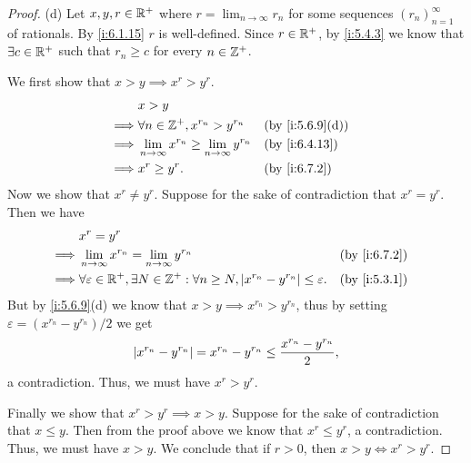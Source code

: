 \begin{proof}{(d)}
  Let \(x, y, r \in \mathbb{R}^+\) where \(r = \lim_{n \to \infty} r_n\) for some sequences \((r_n)_{n = 1}^\infty\) of rationals.
  By \cref{i:6.1.15} \(r\) is well-defined.
  Since \(r \in \mathbb{R}^+\), by \cref{i:5.4.3} we know that \(\exists c \in \mathbb{R}^+\) such that \(r_n \geq c\) for every \(n \in \mathbb{Z}^+\).

  We first show that \(x > y \implies x^r > y^r\).
  \begin{align*}
             & x > y                                                                             \\
    \implies & \forall n \in \Z^+, x^{r_n} > y^{r_n}                        &  & \by{i:5.6.9}[d] \\
    \implies & \lim_{n \to \infty} x^{r_n} \geq \lim_{n \to \infty} y^{r_n} &  & \by{i:6.4.13}   \\
    \implies & x^r \geq y^r.                                                &  & \by{i:6.7.2}
  \end{align*}
  Now we show that \(x^r \neq y^r\).
  Suppose for the sake of contradiction that \(x^r = y^r\).
  Then we have
  \begin{align*}
             & x^r = y^r                                                                                                                        \\
    \implies & \lim_{n \to \infty} x^{r_n} = \lim_{n \to \infty} y^{r_n}                                                      &  & \by{i:6.7.2} \\
    \implies & \forall \varepsilon \in \R^+, \exists N \in \Z^+ : \forall n \geq N, \abs{x^{r_n} - y^{r_n}} \leq \varepsilon. &  & \by{i:5.3.1}
  \end{align*}
  But by \cref{i:5.6.9}(d) we know that \(x > y \implies x^{r_n} > y^{r_n}\), thus by setting \(\varepsilon = (x^{r_n} - y^{r_n}) / 2\) we get
  \[
    \left\lvert x^{r_n} - y^{r_n}\right\rvert = x^{r_n} - y^{r_n} \leq \dfrac{x^{r_n} - y^{r_n}}{2},
  \]
  a contradiction.
  Thus, we must have \(x^r > y^r\).

  Finally we show that \(x^r > y^r \implies x > y\).
  Suppose for the sake of contradiction that \(x \leq y\).
  Then from the proof above we know that \(x^r \leq y^r\), a contradiction.
  Thus, we must have \(x > y\).
  We conclude that if \(r > 0\), then \(x > y \iff x^r > y^r\).
\end{proof}

